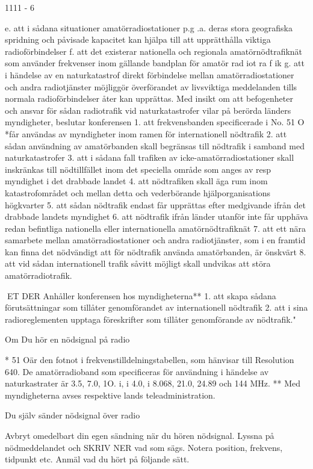 1111 - 6

e. att i sådana situationer amatörradiostationer p.g .a. deras stora geografiska spridning och påvisade kapacitet kan hjälpa till
att upprätthålla viktiga radioförbindelser
f. att det existerar nationella och regionala
amatörnödtrafiknät som använder frekvenser inom gällande bandplan för amatör rad iot ra f ik
g. att i händelse av en naturkatastrof direkt
förbindelse mellan amatörradiostationer
och andra radiotjänster möjliggör överförandet av livsviktiga meddelanden tills
normala radioförbindelser åter kan upprättas.
Med insikt om att befogenheter och ansvar
för sådan radiotrafik vid naturkatastrofer vilar på berörda länders myndigheter, beslutar
konferensen
1. att frekvensbanden specificerade i No.
51 O *får användas av myndigheter inom
ramen för internationell nödtrafik
2. att sådan användning av amatörbanden
skall begränsas till nödtrafik i samband
med naturkatastrofer
3. att i sådana fall trafiken av icke-amatörradiostationer skall inskränkas till nödtillfället inom det speciella område som
anges av resp myndighet i det drabbade
landet
4. att nödtrafiken skall äga rum inom
katastrofområdet och mellan detta och
vederbörande hjälporganisations högkvarter
5. att sådan nödtrafik endast får upprättas
efter medgivande ifrån det drabbade landets myndighet
6. att nödtrafik ifrån länder utanför inte får
upphäva redan befintliga nationella eller
internationella amatörnödtrafiknät
7. att ett nära samarbete mellan amatörradiostationer och andra radiotjänster,
som i en framtid kan finna det nödvändigt
att för nödtrafik använda amatörbanden,
är önskvärt
8. att vid sådan internationell trafik såvitt
möjligt skall undvikas att störa amatörradiotrafik.

ET DER
Anhåller konferensen hos myndigheterna**
1. att skapa sådana förutsättningar som tillåter genomförandet av internationell nödtrafik
2. att i sina radioreglementen upptaga föreskrifter som tillåter genomförande av nödtrafik."

Om Du hör en nödsignal på radio

* 51 Oär den fotnot i frekvenstilldelningstabellen, som hänvisar till Resolution 640.
De amatörradioband som specificeras för
användning i händelse av naturkastrater
är 3.5, 7.0, 1O. i, i 4.0, i 8.068, 21.0, 24.89
och 144 MHz.
** Med myndigheterna avses respektive
lands teleadministration.

Du själv sänder nödsignal över radio

Avbryt omedelbart din egen sändning när du
hören nödsignal. Lyssna på nödmeddelandet
och SKRIV NER vad som sägs. Notera position, frekvens, tidpunkt etc. Anmäl vad du
hört på följande sätt.

